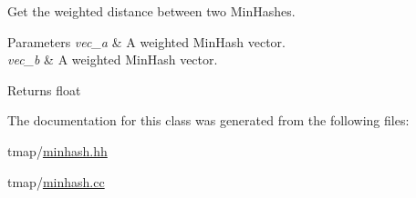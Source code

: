 Get the weighted distance between two Min\+Hashes. 


\begin{DoxyParams}{Parameters}
{\em vec\+\_\+a} & A weighted Min\+Hash vector. \\
\hline
{\em vec\+\_\+b} & A weighted Min\+Hash vector. \\
\hline
\end{DoxyParams}
\begin{DoxyReturn}{Returns}
float 
\end{DoxyReturn}


The documentation for this class was generated from the following files\+:\begin{DoxyCompactItemize}
\item 
tmap/\hyperlink{minhash_8hh}{minhash.\+hh}\item 
tmap/\hyperlink{minhash_8cc}{minhash.\+cc}\end{DoxyCompactItemize}
